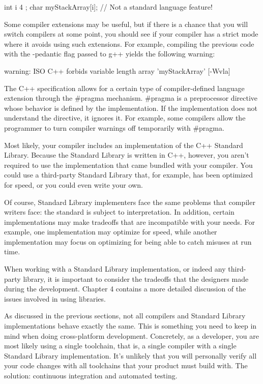 \begin{cpp}
int i { 4 };
char myStackArray[i]; // Not a standard language feature!
\end{cpp}

Some compiler extensions may be useful, but if there is a chance that you will switch compilers at some point, you should see if your compiler has a strict mode where it avoids using such extensions. For example, compiling the previous code with the -pedantic flag passed to g++ yields the following warning:

\begin{shell}
warning: ISO C++ forbids variable length array 'myStackArray' [-Wvla]
\end{shell}

The C++ specification allows for a certain type of compiler-defined language extension through the \#pragma mechanism. \#pragma is a preprocessor directive whose behavior is defined by the implementation. If the implementation does not understand the directive, it ignores it. For example, some compilers allow the programmer to turn compiler warnings off temporarily with \#pragma.


Most likely, your compiler includes an implementation of the C++ Standard Library. Because the Standard Library is written in C++, however, you aren’t required to use the implementation that came bundled with your compiler. You could use a third-party Standard Library that, for example, has been optimized for speed, or you could even write your own.

Of course, Standard Library implementers face the same problems that compiler writers face: the standard is subject to interpretation. In addition, certain implementations may make tradeoffs that are incompatible with your needs. For example, one implementation may optimize for speed, while another implementation may focus on optimizing for being able to catch misuses at run time.

When working with a Standard Library implementation, or indeed any third-party library, it is important to consider the tradeoffs that the designers made during the development. Chapter 4 contains a more detailed discussion of the issues involved in using libraries.


As discussed in the previous sections, not all compilers and Standard Library implementations behave exactly the same. This is something you need to keep in mind when doing cross-platform development. Concretely, as a developer, you are most likely using a single toolchain, that is, a single compiler with a single Standard Library implementation. It’s unlikely that you will personally verify all your code changes with all toolchains that your product must build with. The solution: continuous integration and automated testing.

